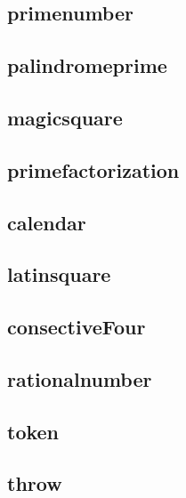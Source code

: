     \subsection{primenumber}
        
    \subsection{palindromeprime}
        
    \subsection{magicsquare}
        
    \subsection{primefactorization}
        
    \subsection{calendar}
        
    \subsection{latinsquare}
        
    \subsection{consectiveFour}
        
    \subsection{rationalnumber}
        
    \subsection{token}
        
    \subsection{throw}
        
        
        
        